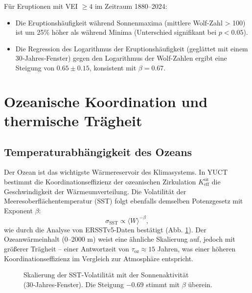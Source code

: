 \documentclass[12pt,a4paper]{article}
\newcommand{\Keff}{K_{\mathrm{eff}}}
\newcommand{\be}{\beta}
\begin{document}
	Für Eruptionen mit VEI \(\ge 4\) im Zeitraum 1880–2024:
	\begin{itemize}
		\item Die Eruptionshäufigkeit während Sonnenmaxima (mittlere Wolf-Zahl > 100) ist um 25\% höher als während Minima (Unterschied signifikant bei \(p < 0.05\)).
		\item Die Regression des Logarithmus der Eruptionshäufigkeit (geglättet mit einem 30‑Jahres‑Fenster) gegen den Logarithmus der Wolf-Zahlen ergibt eine Steigung von \(0.65 \pm 0.15\), konsistent mit \(\beta = 0.67\).
	\end{itemize}
	
	\section{Ozeanische Koordination und thermische Trägheit}
	
	\subsection{Temperaturabhängigkeit des Ozeans}
	
	Der Ozean ist das wichtigste Wärmereservoir des Klimasystems. In YUCT bestimmt die Koordinationseffizienz der ozeanischen Zirkulation \(\Keff^{\text{oz}}\) die Geschwindigkeit der Wärmeumverteilung. Die Volatilität der Meeresoberflächentemperatur (SST) folgt ebenfalls demselben Potenzgesetz mit Exponent \(\be\):
	\[
	\sigma_{\text{SST}} \propto \langle W \rangle^{-\be},
	\]
	wie durch die Analyse von ERSSTv5-Daten bestätigt (Abb. \ref{fig:sst_scaling}). Der Ozeanwärmeinhalt (0–2000 m) weist eine ähnliche Skalierung auf, jedoch mit größerer Trägheit – einer Antwortzeit von \(\tau_{\text{oz}} \approx 15\) Jahren, was einer höheren Koordinationseffizienz im Vergleich zur Atmosphäre entspricht.
	
	\begin{figure}[htbp]
		\centering
		\caption{Skalierung der SST-Volatilität mit der Sonnenaktivität (30‑Jahres‑Fenster). Die Steigung \(-0.69\) stimmt mit \(\be\) überein.}
		\label{fig:sst_scaling}
	\end{figure}
	
\end{document}
